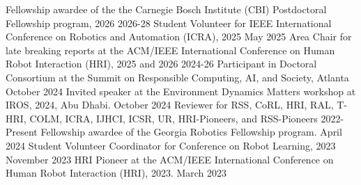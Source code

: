 

\vspace{2mm}
\begin{cvhonors}

\cvhonor
    {Fellowship awardee of the the Carnegie Bosch Institute (CBI) Postdoctoral Fellowship program, 2026} %
    {2026-28} %
    \vspace{-1mm}
\cvhonor
    {Student Volunteer for IEEE International Conference on Robotics and Automation (ICRA), 2025} %
    {May 2025} %
    \vspace{-1mm}
\cvhonor
    {Area Chair for late breaking reports at the ACM/IEEE International Conference on Human Robot Interaction (HRI), 2025 and 2026} %
    {2024-26} %
    \vspace{-1mm}
\cvhonor
    {Participant in Doctoral Consortium at the Summit on Responsible Computing, AI, and Society, Atlanta} %
    {October 2024} %
    \vspace{-1mm}
\cvhonor
    {Invited speaker at the Environment Dynamics Matters workshop at IROS, 2024, Abu Dhabi.} %
    {October 2024} %
    \vspace{-1mm}
\cvhonor
    {Reviewer for RSS, CoRL, HRI, RAL, T-HRI, COLM, ICRA, IJHCI, ICSR, UR, HRI-Pioneers, and RSS-Pioneers} %
    {2022-Present} %
    \vspace{-1mm}
 \cvhonor
    {Fellowship awardee of the Georgia Robotics Fellowship program.} %
    {April 2024} %
    \vspace{-1mm}
 \cvhonor
    {Student Volunteer Coordinator for Conference on Robot Learning, 2023} %
    {November 2023} %
    \vspace{-1mm}
 \cvhonor
    {HRI Pioneer at the ACM/IEEE International Conference on Human Robot Interaction (HRI), 2023.} %
    {March 2023} %
    \vspace{-1mm}

\end{cvhonors}
